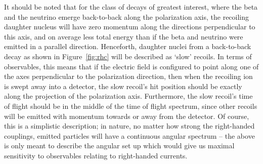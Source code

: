 It should be noted that for the class of decays of greatest interest, where the beta and the neutrino emerge back-to-back along the polarization axis, the recoiling daughter nucleus will have zero momentum along the directions perpendicular to this axis, and on average less total energy than if the beta and neutrino were emitted in a parallel direction.  Henceforth, daughter nuclei from a back-to-back decay as shown in Figure~\ref{fig:rhc} will be described as `slow' recoils.  In terms of observables, 
this means that if the electric field is configured to point along one of the axes perpendicular to the polarization direction, then when the recoiling ion is swept away into a detector, the slow recoil's hit position should be exactly along the projection of the polarization axis.  Furthermore, the slow recoil's time of flight should be in the middle of the time of flight spectrum, since other recoils will be emitted with momentum towards or away from the detector.  Of course, this is a simplistic description; in nature, no matter how strong the right-handed couplings, emitted particles will have a continuous angular spectrum -- the above is only meant to describe the angular set up which would give us maximal sensitivity to observables relating to right-handed currents.  

